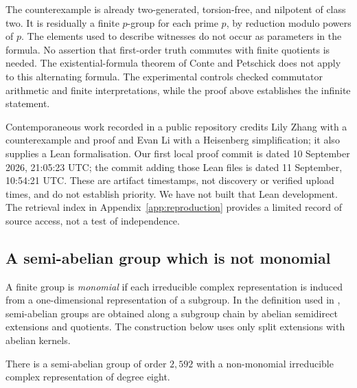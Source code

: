 The counterexample is already two-generated, torsion-free, and
nilpotent of class two. It is residually a finite $p$-group for
each prime $p$, by reduction modulo powers of $p$.
The elements used to describe witnesses do not occur as parameters
in the formula. No assertion that first-order truth commutes with
finite quotients is needed. The existential-formula theorem of
Conte and Petschick does not apply to this alternating formula.
The experimental controls checked commutator arithmetic and finite
interpretations, while the proof above establishes the infinite
statement.

Contemporaneous work recorded in a public repository credits Lily Zhang
with a counterexample and proof and Evan Li with a Heisenberg
simplification; it also supplies a Lean formalisation\cite{zhang-li-concise}.
Our first local proof commit is dated 10 September 2026, 21:05:23 UTC;
the commit adding those Lean files is dated 11 September, 10:54:21 UTC.
These are artifact timestamps, not discovery or verified upload times,
and do not establish priority. We have not built that Lean development.
The retrieval index in Appendix~\ref{app:reproduction} provides a limited
record of source access, not a test of independence.


\subsection{A semi-abelian group which is not monomial}
\label{subsec:semiabelian}

A finite group is \emph{monomial} if each irreducible complex
representation is induced from a one-dimensional representation of
a subgroup. In the definition used in , semi-abelian
groups are obtained along a subgroup chain by abelian semidirect
extensions and quotients. The construction below uses only split
extensions with abelian kernels.

\begin{theorem}
\label{thm:semiabelian}
There is a semi-abelian group of order $2,592$ with a non-monomial
irreducible complex representation of degree eight.
\end{theorem}

